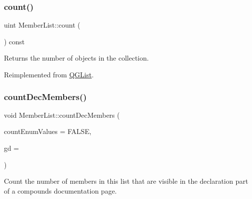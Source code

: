 \subsubsection{\texorpdfstring{count()}{count()}}
{\footnotesize\ttfamily uint Member\+List\+::count (\begin{DoxyParamCaption}{ }\end{DoxyParamCaption}) const\hspace{0.3cm}{\ttfamily [virtual]}}

Returns the number of objects in the collection. 

Reimplemented from \mbox{\hyperlink{class_q_g_list_af765260057e85e575adff7fd9f25d062}{Q\+G\+List}}.

\mbox{\label{class_member_list_a66706c34a0b45bb65a60db005109f2f5}} 
\subsubsection{\texorpdfstring{countDecMembers()}{countDecMembers()}}
{\footnotesize\ttfamily void Member\+List\+::count\+Dec\+Members (\begin{DoxyParamCaption}\item[{bool}]{count\+Enum\+Values = {\ttfamily FALSE},  }\item[{\mbox{\hyperlink{class_group_def}{Group\+Def}} $\ast$}]{gd = {} }\end{DoxyParamCaption})}

Count the number of members in this list that are visible in the declaration part of a compound\textquotesingle{}s documentation page. \mbox{\label{class_member_list_ab5c264ca14dfd80e23dbff43cabf1771}} 
